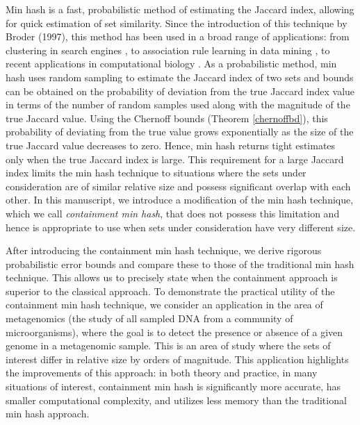 \documentclass[11pt,reqno]{amsart}
\theoremstyle{remark}
\numberwithin{equation}{section}
\begin{document}
Min hash\cite{broder1997resemblance} is a fast, probabilistic method of estimating the Jaccard index, allowing for quick estimation of set similarity. Since the introduction of this technique by Broder (1997), this method has been used in a broad range of applications: from clustering in search engines \cite{das2007google}, to association rule learning in data mining \cite{cohen2001finding}, to recent applications in computational biology \cite{ondov2016mash, sourmash}. As a probabilistic method, min hash uses random sampling to estimate the Jaccard index of two sets and bounds can be obtained on the probability of deviation from the true Jaccard index value in terms of the number of random samples used along with the magnitude of the true Jaccard value. Using the Chernoff bounds (Theorem \ref{chernoffbd}), this probability of deviating from the true value grows exponentially as the size of the true Jaccard value decreases to zero. Hence, min hash returns tight estimates only when the true Jaccard index is large. This requirement for a large Jaccard index limits the min hash technique to situations where the sets under consideration are of similar relative size and possess significant overlap with each other. In this manuscript, we introduce a modification of the min hash technique, which we call \textit{containment min hash}, that does not possess this limitation and hence is appropriate to use when sets under consideration have very different size.

After introducing the containment min hash technique, we derive rigorous probabilistic error bounds and compare these to those of the traditional min hash technique. This allows us to precisely state when the containment approach is superior to the classical approach. To demonstrate the practical utility of the containment min hash technique, we consider an application in the area of metagenomics (the study of all sampled DNA from a community of microorganisms), where the goal is to detect the presence or absence of a given genome in a metagenomic sample. This is an area of study where the sets of interest differ in relative size by orders of magnitude. This application highlights the improvements of this approach: in both theory and practice, in many situations of interest, containment min hash is significantly more accurate, has smaller computational complexity, and utilizes less memory than the traditional min hash approach.
\end{document}
